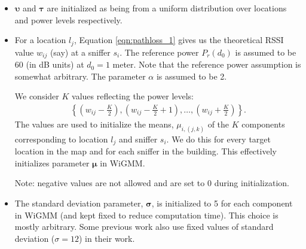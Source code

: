 \begin{itemize}

\item ${\boldsymbol\upsilon}$ and ${\boldsymbol\tau}$ are initialized as being from a uniform distribution over locations and power levels respectively.

\item For a location $l_{j}$, Equation \ref{eqn:pathloss_1} gives us the theoretical RSSI value  $w_{ij}$ (say) at a sniffer $s_{i}$. The reference power $P_r({d_0})$
is assumed to be 60 (in dB units) at $d_0=1$ meter. Note that the reference power
assumption is somewhat arbitrary. The parameter $\alpha$ is assumed to be 2. 

We consider $K$ values reflecting the power levels:
\begin{align}
\left\{ (w_{ij}-\frac{K}{2}), (w_{ij}-\frac{K}{2}+1), \dots ,(w_{ij}+\frac{K}{2})\right\}. \nonumber
\end{align}
The values are used to initialize the means, $\mu_{i, (j,k)}$ of the $K$ components corresponding to location $l_{j}$ and sniffer $s_{i}$. We do this for every target location in the map and for each sniffer in the building. This effectively initializes parameter ${\boldsymbol\mu}$ in WiGMM. 

Note: negative values are not allowed and are set to 0 during initialization.

\item The standard deviation parameter, ${\boldsymbol\sigma}$, is initialized to 5 for each component in WiGMM (and kept fixed to reduce computation time). This choice is mostly arbitrary. Some previous work \cite{Tao:2003:WLL:941311.941314} also use fixed values of standard deviation ($\sigma=12$) in their work. \\

\end{itemize}



